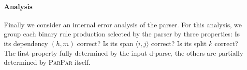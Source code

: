 \documentclass[11pt,letterpaper]{article}
\newcommand{\Span}[1]{\langle #1 \rangle}
\newcommand{\ParseName}{\textsc{ParPar}\xspace}
\newcommand{\lpkcomment}[1]{\textcolor{red}{\bf \small [#1 --lpk]}}
\begin{document}









\paragraph{Analysis}
\label{sec:analysis}
Finally we consider an internal error analysis of
the parser. For this analysis, we group each binary rule production
selected by the parser by three properties:
Is its dependency $(h, m)$ correct? Is its span $\Span{i,j}$ correct? 
Is its split $k$ correct? The first property fully determined by the 
input d-parse, the others are partially determined by \ParseName itself.
\end{document}
